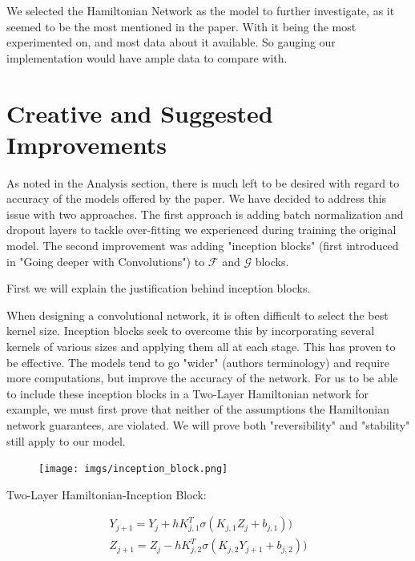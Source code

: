 \documentclass{article}
\theoremstyle{remark}
\begin{document}
We selected the Hamiltonian Network as the model to further investigate, as it seemed to be the most mentioned in the paper. With it being the most experimented on, and most data about it 
available. So gauging our implementation would have ample data to compare with.


\pagebreak
\section*{Creative and Suggested Improvements}
    As noted in the Analysis section, there is much left to be desired with regard to accuracy of the models offered by the paper. We have decided to address this issue with two approaches. 
The first approach is adding batch normalization and dropout layers to tackle over-fitting we experienced during training the original model. The second improvement was adding "inception 
blocks" (first introduced in "Going deeper with Convolutions"\cite{C. Szegedy}) to $\mathcal{F}$ and $\mathcal{G}$ blocks. \par
First we will explain the justification behind inception blocks. \par
When designing a convolutional network, it is often difficult to select the best kernel size. Inception blocks seek to overcome this by incorporating several kernels of various sizes and 
applying them all at each stage. This has proven to be effective. The models tend to go "wider" (authors terminology) and require more computations, but improve the accuracy of the network. 
For us to be able to include these inception blocks in a Two-Layer Hamiltonian network for example, we must first prove that neither of the assumptions the Hamiltonian network guarantees, 
are violated. We will prove both "reversibility" and "stability" still apply to our model. \\
\begin{figure}[H]
    \centering
    \texttt{[image: imgs/inception\_block.png]}
\end{figure}
Two-Layer Hamiltonian-Inception Block:

\begin{gather*}
    Y_{j+1} = Y_{j} + h K^T_{j,1} \sigma (K_{j,1} Z_j + b_{j,1})) \\
    Z_{j+1} = Z_{j} - h K^T_{j,2} \sigma (K_{j,2} Y_{j+1} + b_{j,2}))
\end{gather*}
    
\end{document}
